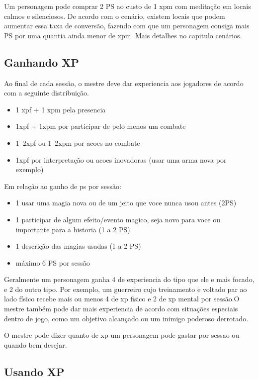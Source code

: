 Um personagem pode comprar 2 PS ao custo de 1 xpm com meditação em locais calmos e silenciosos. De acordo com o cenário, existem locais que podem aumentar essa taxa de conversão, fazendo com que um personagem consiga mais PS por uma quantia ainda menor de xpm. Mais detalhes no capitulo cenários.

\subsection{Ganhando XP}
	
Ao final de cada sessão, o mestre deve dar experiencia aos jogadores de acordo com a seguinte distribuição. 

\begin{itemize}
\item  1 xpf + 1 xpm pela presencia
\item  1xpf + 1xpm por participar de pelo menos um combate
\item  1~2xpf ou 1~2xpm por acoes no combate
\item  1xpf por interpretação ou acoes inovadoras (usar uma arma nova por exemplo)
\end{itemize}

	Em relação ao ganho de ps por sessão:
\begin{itemize}
\item 1 usar uma magia nova ou de um jeito que voce nunca usou antes (2PS)
\item 1 participar de algum efeito/evento magico, seja novo para voce ou importante para a historia (1 a 2 PS)
\item 1 descrição das magias usadas (1 a 2 PS)
\item máximo 6 PS por sessão 
\end{itemize}


Geralmente um personagem ganha 4 de experiencia do tipo que ele e mais focado, e 2 do outro tipo. Por exemplo, um guerreiro cujo treinamento e voltado par ao lado físico recebe mais ou menos 4 de xp fisico e 2 de xp mental por sessão.O mestre também pode dar mais experiencia de acordo com situações especiais dentro de jogo, como um objetivo alcançado ou um inimigo poderoso derrotado.

O mestre pode dizer quanto de xp um personagem pode gastar por sessao ou quando bem desejar. 

\subsection{Usando XP}

